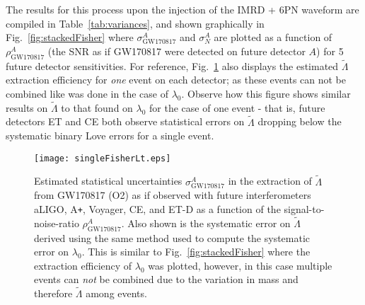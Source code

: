 \documentclass[prd,twocolumn,nofootinbib,superscriptaddress,amsmath,amssymb]{revtex4-1}
\begin{document}
The results for this process upon the injection of the IMRD + 6PN waveform are compiled in Table~\ref{tab:variances}, and shown graphically in Fig.~\ref{fig:stackedFisher} where $\sigma^A_{\text{GW170817}}$ and $\sigma^A_N$ are plotted as a function of $\rho^A_{\text{GW170817}}$ (the SNR as if GW170817 were detected on future detector $A$) for 5 future detector sensitivities.
For reference, Fig.~\ref{fig:singleFisherLt} also displays the estimated $\tilde\Lambda$ extraction efficiency for \emph{one} event on each detector; as these events can not be combined like was done in the case of $\lambda_0$.
Observe how this figure shows similar results on $\tilde\Lambda$ to that found on $\lambda_0$ for the case of one event - that is, future detectors ET and CE both observe statistical errors on $\tilde\Lambda$ dropping below the systematic binary Love errors for a single event.
\begin{figure}
\begin{center} 
\texttt{[image: singleFisherLt.eps]}
\end{center}
\caption{
Estimated statistical uncertainties $\sigma^A_{\text{GW170817}}$ in the extraction of $\tilde\Lambda$ from GW170817 (O2) as if observed with future interferometers aLIGO, A\texttt{+}, Voyager, CE, and ET-D as a function of the signal-to-noise-ratio $\rho^A_{\text{GW170817}}$.
Also shown is the systematic error on $\tilde\Lambda$ derived using the same method used to compute the systematic error on $\lambda_0$.
This is similar to Fig.~\ref{fig:stackedFisher} where the extraction efficiency of $\lambda_0$ was plotted, however, in this case multiple events can \emph{not} be combined due to the variation in mass and therefore $\tilde\Lambda$ among events.
}
\label{fig:singleFisherLt}
\end{figure} 
\end{document}
